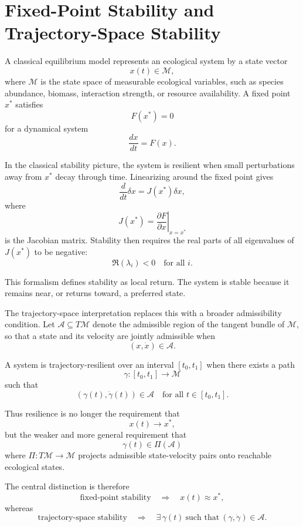 \documentclass[11pt,a4paper]{article}
\newcommand{\Aspace}{\mathcal{A}}
\newcommand{\Mspace}{\mathcal{M}}
\begin{document}
\newpage 
\appendix
{}

\section{Fixed-Point Stability and Trajectory-Space Stability}

A classical equilibrium model represents an ecological system by a state vector
\[
x(t) \in \Mspace,
\]
where $\Mspace$ is the state space of measurable ecological variables, such as species abundance, biomass, interaction strength, or resource availability. A fixed point $x^\ast$ satisfies
\[
F(x^\ast)=0
\]
for a dynamical system
\[
\frac{dx}{dt}=F(x).
\]

In the classical stability picture, the system is resilient when small perturbations away from $x^\ast$ decay through time. Linearizing around the fixed point gives
\[
\frac{d}{dt}\delta x = J(x^\ast)\delta x,
\]
where
\[
J(x^\ast)=\left.\frac{\partial F}{\partial x}\right|_{x=x^\ast}
\]
is the Jacobian matrix. Stability then requires the real parts of all eigenvalues of $J(x^\ast)$ to be negative:
\[
\Re(\lambda_i)<0
\quad \text{for all } i.
\]

This formalism defines stability as local return. The system is stable because it remains near, or returns toward, a preferred state.

The trajectory-space interpretation replaces this with a broader admissibility condition. Let $\Aspace \subseteq T\Mspace$ denote the admissible region of the tangent bundle of $\Mspace$, so that a state and its velocity are jointly admissible when
\[
(x,\dot{x}) \in \Aspace.
\]

A system is trajectory-resilient over an interval $[t_0,t_1]$ when there exists a path
\[
\gamma:[t_0,t_1]\rightarrow \Mspace
\]
such that
\[
(\gamma(t),\dot{\gamma}(t))\in \Aspace
\quad \text{for all } t\in[t_0,t_1].
\]

Thus resilience is no longer the requirement that
\[
x(t)\rightarrow x^\ast,
\]
but the weaker and more general requirement that
\[
\gamma(t)\in \Pi(\Aspace)
\]
where $\Pi:T\Mspace\rightarrow \Mspace$ projects admissible state-velocity pairs onto reachable ecological states.

The central distinction is therefore
\[
\text{fixed-point stability}
\quad \Rightarrow \quad
x(t)\approx x^\ast,
\]
whereas
\[
\text{trajectory-space stability}
\quad \Rightarrow \quad
\exists\,\gamma(t)\ \text{such that}\ (\gamma,\dot{\gamma})\in\Aspace.
\]
\end{document}
